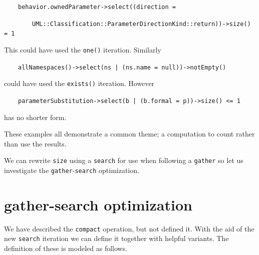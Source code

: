 \documentclass[
]{ceurart}
\begin{document}
\begin{description}[itemsep=-0.2cm]\small\begin{samepage}
\item ~~~~\verb!behavior.ownedParameter->select((direction =!
\item ~~~~~~~~\verb!UML::Classification::ParameterDirectionKind::return))->size() = 1!
\end{samepage}\end{description}

This could have used the \verb!one()! iteration. Similarly

\begin{description}[itemsep=-0.2cm]\small
\item ~~~~\verb!allNamespaces()->select(ns | (ns.name = null))->notEmpty()!
\end{description}

could have used the \verb!exists()! iteration. However

\begin{description}[itemsep=-0.2cm]\small
\item ~~~~\verb!parameterSubstitution->select(b | (b.formal = p))->size() <= 1!
\end{description}
has no shorter form.

These examples all demonstrate a common theme; a computation to count rather than use the results. 

We can rewrite \verb!size! using a \verb!search! for use when following a \verb!gather! so let us investigate the \verb!gather!-\verb!search! optimization.

\section{gather-search optimization}\label{gather-search-optimization}

We have described the \verb!compact! operation, but not defined it. With the aid of the new \verb!search! iteration we can define it together with helpful variants. The definition of these is modeled as follows.
\end{document}
